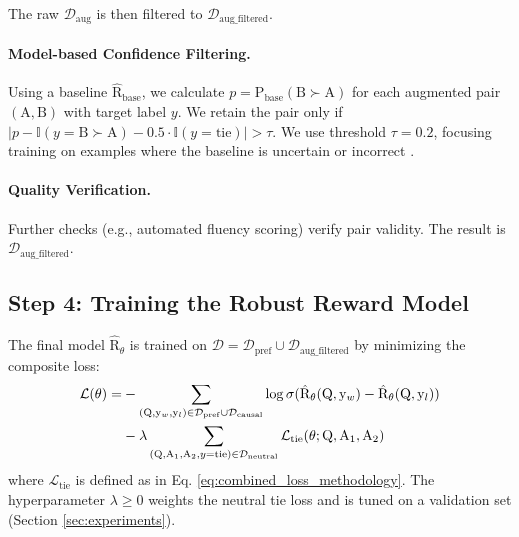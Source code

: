 The raw $\mathcal{D}_{\mathrm{aug}}$ is then filtered to $\mathcal{D}_{\mathrm{aug\_filtered}}$.

\paragraph{Model-based Confidence Filtering.} Using a baseline $\hat{\mathrm{R}}_{\mathrm{base}}$, we calculate $p = \mathrm{P}_{\mathrm{base}}(\mathrm{B} \succ \mathrm{A})$ for each augmented pair $(\mathrm{A}, \mathrm{B})$ with target label $y$. We retain the pair only if $|p - \mathbb{I}(y = \text{B} \succ \mathrm{A}) - 0.5 \cdot \mathbb{I}(y = \text{tie})| > \tau$. We use threshold $\tau=0.2$, focusing training on examples where the baseline is uncertain or incorrect \citep{liu2024rrm}.

\paragraph{Quality Verification.} Further checks (e.g., automated fluency scoring) verify pair validity. The result is $\mathcal{D}_{\mathrm{aug\_filtered}}$.

\subsection{Step 4: Training the Robust Reward Model}
\label{subsec:training_appendix} 

The final model $\hat{\mathrm{R}}_\theta$ is trained on $\mathcal{D} = \mathcal{D}_{\mathrm{pref}} \cup \mathcal{D}_{\mathrm{aug\_filtered}}$ by minimizing the composite loss:
\begin{align}
\mathcal{L}(\theta) = &- \sum_{(\mathrm{Q}, \mathrm{y}_w, \mathrm{y}_l) \in \mathcal{D}_{\mathrm{pref}} \cup \mathcal{D}_{\mathrm{causal}}} \log \sigmoid(\hat{\mathrm{R}}_\theta(\mathrm{Q}, \mathrm{y}_w) - \hat{\mathrm{R}}_\theta(\mathrm{Q}, \mathrm{y}_l)) \nonumber \\
&- \lambda \sum_{(\mathrm{Q}, \mathrm{A}_1, \mathrm{A}_2, y=\text{tie})\in \mathcal{D}_{\mathrm{neutral}}} \mathcal{L}_{\mathrm{tie}}(\theta; \mathrm{Q}, \mathrm{A}_1, \mathrm{A}_2)
\label{eq:combined_loss_appendix}
\end{align}
where $\mathcal{L}_{\mathrm{tie}}$ is defined as in Eq. \ref{eq:combined_loss_methodology}. The hyperparameter $\lambda \ge 0$ weights the neutral tie loss and is tuned on a validation set (Section \ref{sec:experiments}).
